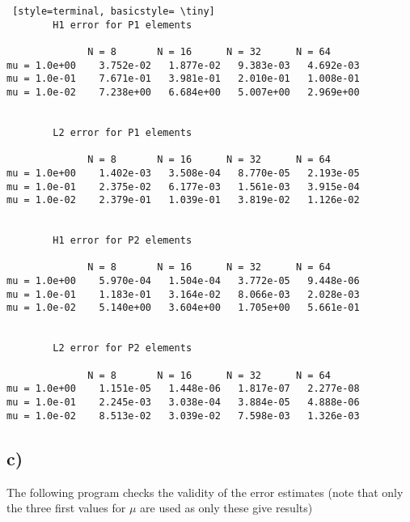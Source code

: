 \documentclass[a4paper,english,12pt,twoside]{article}
\begin{document}
\begin{lstlisting} [style=terminal, basicstyle= \tiny]
	    H1 error for P1 elements

           	  N = 8  	  N = 16 	  N = 32  	  N = 64
mu = 1.0e+00	3.752e-02	1.877e-02	9.383e-03	4.692e-03
mu = 1.0e-01	7.671e-01	3.981e-01	2.010e-01	1.008e-01
mu = 1.0e-02	7.238e+00	6.684e+00	5.007e+00	2.969e+00


	    L2 error for P1 elements

           	  N = 8  	  N = 16 	  N = 32  	  N = 64
mu = 1.0e+00	1.402e-03	3.508e-04	8.770e-05	2.193e-05
mu = 1.0e-01	2.375e-02	6.177e-03	1.561e-03	3.915e-04
mu = 1.0e-02	2.379e-01	1.039e-01	3.819e-02	1.126e-02


	    H1 error for P2 elements

           	  N = 8  	  N = 16 	  N = 32  	  N = 64
mu = 1.0e+00	5.970e-04	1.504e-04	3.772e-05	9.448e-06
mu = 1.0e-01	1.183e-01	3.164e-02	8.066e-03	2.028e-03
mu = 1.0e-02	5.140e+00	3.604e+00	1.705e+00	5.661e-01


	    L2 error for P2 elements

           	  N = 8  	  N = 16 	  N = 32  	  N = 64
mu = 1.0e+00	1.151e-05	1.448e-06	1.817e-07	2.277e-08
mu = 1.0e-01	2.245e-03	3.038e-04	3.884e-05	4.888e-06
mu = 1.0e-02	8.513e-02	3.039e-02	7.598e-03	1.326e-03
\end{lstlisting}

\subsection*{c)}
The following program checks the validity of the error estimates (note that only the three first values for $\mu$ are used as only these give results)
\end{document}
